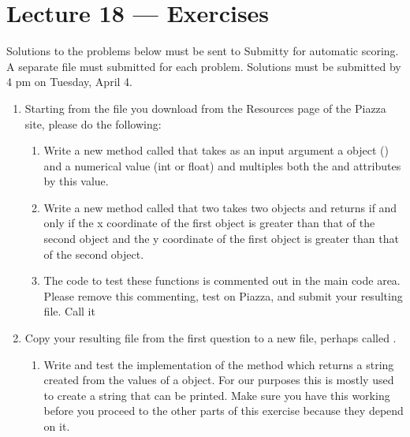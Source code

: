 \documentclass[letterpaper,10pt,english]{sphinxmanual}
\begin{document}
\chapter{Lecture 18 — Exercises}
\label{\detokenize{lecture_notes/lec18_classes1_exercises/exercises:lecture-18-exercises}}\label{\detokenize{lecture_notes/lec18_classes1_exercises/exercises::doc}}
Solutions to the problems below must be sent to Submitty for
automatic scoring.  A separate file must submitted for each problem.
Solutions must be submitted by 4 pm on Tuesday, April 4.
\begin{enumerate}
\item {} 
Starting from the  file you download from the
Resources page of the Piazza site, please do the following:
\begin{enumerate}
\item {} 
Write a new  method called  that takes as an
input argument a  object () and a numerical
value (int or float) and multiples both the  and 
attributes by this value.

\item {} 
Write a new  method called  that two
takes two  objects and returns  if and only
if the x coordinate of the first object is greater than that of
the second object and the y coordinate of the first object is
greater than that of the second object.

\item {} 
The code to test these functions is commented out in the main
code area.  Please remove this commenting, test on Piazza, and
submit your resulting  file.  Call it 

\end{enumerate}

\item {} 
Copy your resulting file from the first question to a new file,
perhaps called .
\begin{enumerate}
\item {} 
Write and test the implementation of the method 
which returns a string created from the values of a 
object.  For our purposes this is mostly used to create a string
that can be printed.   Make sure you have this working before
you proceed to the other parts of this exercise because they
depend on it.


\end{enumerate}
\end{enumerate}
\end{document}
